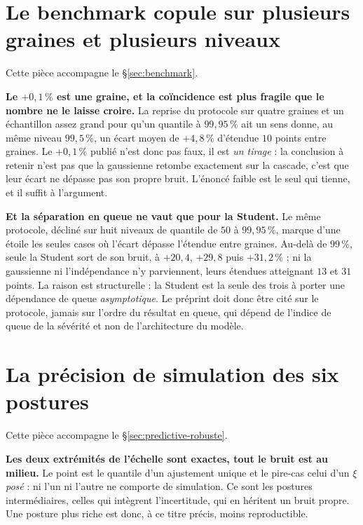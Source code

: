 \section{Le benchmark copule sur plusieurs graines et plusieurs niveaux}
\label{sec:ann-benchmark-graines}

Cette pièce accompagne le \S\ref{sec:benchmark}.

\textbf{Le $+0{,}1\,\%$ est une graine, et la coïncidence est plus fragile que le nombre ne le
laisse croire.} La reprise du protocole sur quatre graines et un échantillon assez grand pour
qu'un quantile à $99{,}95\,\%$ ait un sens donne, au même niveau
$99{,}5\,\%$, un écart moyen de $+4{,}8\,\%$ d'étendue $10$ points entre graines. Le
$+0{,}1\,\%$ publié n'est donc pas faux, il est \emph{un tirage} : la conclusion à retenir n'est
pas que la gaussienne retombe exactement sur la cascade, c'est que leur écart ne dépasse
pas son propre bruit. L'énoncé faible est le seul qui tienne, et il suffit à l'argument.

\textbf{Et la séparation en queue ne vaut que pour la Student.} Le même protocole, décliné sur
huit niveaux de quantile de $50$ à $99{,}95\,\%$, marque d'une étoile les seules cases où l'écart
dépasse l'étendue entre graines. Au-delà de $99\,\%$, seule la Student sort de son
bruit, à $+20{,}4$, $+29{,}8$ puis $+31{,}2\,\%$ ; ni la gaussienne ni l'indépendance n'y
parviennent, leurs étendues atteignant $13$ et $31$ points. La raison est structurelle : la
Student est la seule des trois à porter une dépendance de queue \emph{asymptotique}. Le préprint
doit donc être cité sur le protocole, jamais sur l'ordre du résultat en queue, qui
dépend de l'indice de queue de la sévérité et non de l'architecture du modèle.

\section{La précision de simulation des six postures}
\label{sec:ann-postures}


Cette pièce accompagne le \S\ref{sec:predictive-robuste}.

\textbf{Les deux extrémités de l'échelle sont exactes, tout le bruit est au milieu.} Le point est
le quantile d'un ajustement unique et le pire-cas celui d'un $\xi$ \emph{posé} : ni l'un ni
l'autre ne comporte de simulation. Ce sont les postures intermédiaires, celles qui intègrent
l'incertitude, qui en héritent un bruit propre. Une posture plus riche est donc, à ce titre
précis, moins reproductible.

